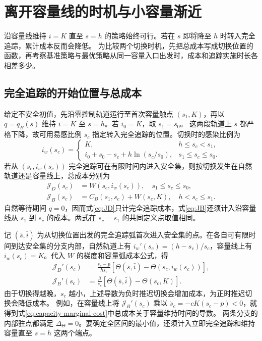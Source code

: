 \documentclass[lang=cn,a4paper,newtx]{elegantpaper}
\theoremstyle{plain}
\theoremstyle{definition}
\begin{document}
\section{离开容量线的时机与小容量渐近}
\label{sec:mechanisms}

沿容量线维持 $i=K$ 直至 $s=h$ 的策略始终可行。若在 $s$ 即将降至 $h$ 时转入完全追踪，累计成本反而会降低。
为比较两个切换时机，先把总成本写成切换位置的函数，再考察基准策略与最优策略从同一容量入口出发时，成本和追踪实施时长各相差多少。

\subsection{完全追踪的开始位置与总成本}
\label{sec:one-dimensional}
给定不安全初值，先沿零控制轨道运行至首次容量触点 $(s_1,K)$，再以 $q=q_B(s)$ 维持 $i=K$ 至 $s=h$。若 $i_0=K$，取 $s_1=s_0$。
这两段轨道上 $s$ 都严格下降，故可用易感比例 $s_c$ 指定转入完全追踪的位置。切换时的感染比例为
\[
i_w(s_c)=
\begin{cases}
K,&h\le s_c<s_1,\\
i_0+s_0-s_c+h\ln(s_c/s_0),&s_1\le s_c\le s_0.
\end{cases}
\]
若从 $(s_c,i_w(s_c))$ 完全追踪可在有限时间内进入安全集，则按切换发生在自然轨道还是容量线上，总成本分别为
\begin{align}
\mathcal J_D(s_c)&=W(s_c,i_w(s_c)),\quad s_1\le s_c\le s_0,
\label{eq:JD}\\
\mathcal J_B(s_c)&=C_B(s_1,s_c)+W(s_c,K),\quad h<s_c\le s_1.
\label{eq:JB}
\end{align}
自然等待期间 $q=0$，因而式\eqref{eq:JD}只计完全追踪成本，式\eqref{eq:JB}还须计入沿容量线从 $s_1$ 到 $s_c$ 的成本。两式在 $s_c=s_1$ 的共同定义点取值相同。

记 $(\bar s,\bar i)$ 为从切换位置出发的完全追踪弧首次进入安全集的点。在各自可有限时间到达安全集的分支内部，自然轨道上有 $i_w'(s_c)=(h-s_c)/s_c$，容量线上有 $i_w(s_c)=K$。代入 $W$ 的梯度和容量弧成本公式，得
\begin{align}
\mathcal J_D'(s_c)&=\frac{s_c-p}{hs_c}
[\Theta(\bar s,\bar i)-\Theta(s_c,i_w(s_c))],\label{eq:JD-derivative}\\
\mathcal J_B'(s_c)&=\frac{\beta}{s_c}
[\Theta(\bar s,\bar i)-\Theta(s_c,K)].\label{eq:JB-derivative}
\end{align}
由于切换得越晚，$s_c$ 越小，上述导数为负时推迟切换会增加成本，为正时推迟切换会降低成本。
例如，在容量线上将 $\mathcal J_B'(s_c)$ 乘以 $\dot s_c=-cK(s_c-p)<0$，就得到式\eqref{eq:capacity-marginal-cost}中总成本关于容量维持时间的导数。
两条分支的内部驻点都满足 $\Delta_\Theta=0$。要确定全区间的最小值，还须计入立即完全追踪和维持容量直至 $s=h$ 这两个端点。
\end{document}
